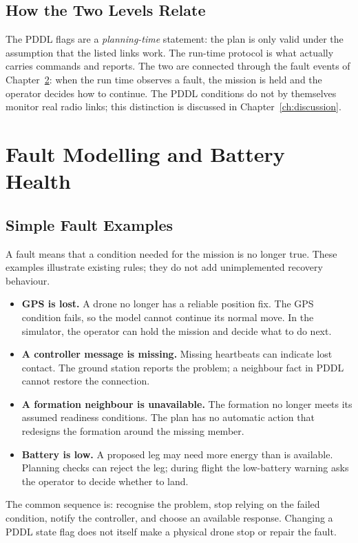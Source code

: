 \documentclass[11pt,a4paper,oneside]{report}
\begin{document}
\section{How the Two Levels Relate}
The PDDL flags are a \emph{planning-time} statement: the plan is only valid under the assumption
that the listed links work. The run-time protocol is what actually carries commands and reports.
The two are connected through the fault events of Chapter~\ref{ch:faults}: when the run time
observes a fault, the mission is held and the operator decides how to continue. The PDDL
conditions do not by themselves monitor real radio links; this distinction is discussed in
Chapter~\ref{ch:discussion}.

\chapter{Fault Modelling and Battery Health}\label{ch:faults}

\section{Simple Fault Examples}
A fault means that a condition needed for the mission is no longer true.
These examples illustrate existing rules; they do not add unimplemented recovery behaviour.
\begin{itemize}
\item \textbf{GPS is lost.} A drone no longer has a reliable position fix. The
GPS condition fails, so the model cannot continue its normal move. In the
simulator, the operator can hold the mission and decide what to do next.
\item \textbf{A controller message is missing.} Missing heartbeats can indicate
lost contact. The ground station reports the problem; a neighbour fact in PDDL
cannot restore the connection.
\item \textbf{A formation neighbour is unavailable.} The formation no longer
meets its assumed readiness conditions. The plan has no automatic action that
redesigns the formation around the missing member.
\item \textbf{Battery is low.} A proposed leg may need more energy than is
available. Planning checks can reject the leg; during flight the low-battery
warning asks the operator to decide whether to land.
\end{itemize}
The common sequence is: recognise the problem, stop relying on the failed
condition, notify the controller, and choose an available response. Changing a
PDDL state flag does not itself make a physical drone stop or repair the fault.
\end{document}
